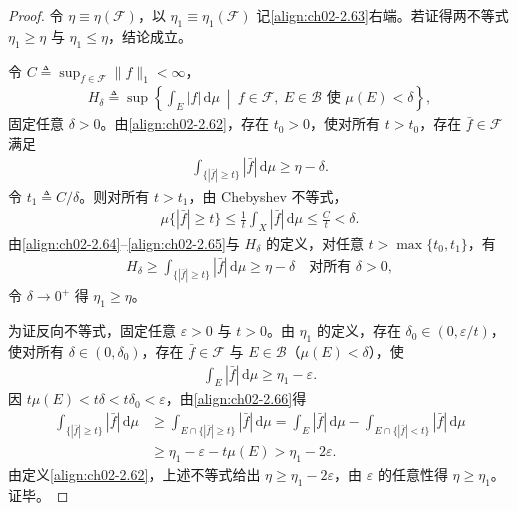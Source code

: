 \documentclass[../../main.tex]{subfiles}%
\begin{document}
\begin{proof}
令 $\eta\equiv\eta(\mathscr F)$，以 $\eta_1\equiv\eta_1(\mathscr F)$ 记\eqref{align:ch02-2.63}右端。若证得两不等式 $\eta_1\geqslant\eta$ 与 $\eta_1\leqslant\eta$，结论成立。

令 $C\triangleq \sup_{f\in\mathscr F}\|f\|_1<\infty$，
\begin{align*}
H_\delta\triangleq \sup\left\{\int_E|f|\,\mathrm{d}\mu\ \middle|\ f\in\mathscr F,\ E\in\mathscr B\text{ 使 }\mu(E)<\delta\right\},
\end{align*}
固定任意 $\delta>0$。由\eqref{align:ch02-2.62}，存在 $t_0>0$，使对所有 $t>t_0$，存在 $\bar f\in\mathscr F$ 满足
\begin{align}
\int_{\{|\bar f|\geqslant t\}}|\bar f|\,\mathrm{d}\mu\geqslant\eta-\delta. \label{align:ch02-2.64}
\end{align}
令 $t_1\triangleq C/\delta$。则对所有 $t>t_1$，由 Chebyshev 不等式，
\begin{align}
\mu\{|\bar f|\geqslant t\}\leqslant\frac1t\int_X|\bar f|\,\mathrm{d}\mu\leqslant\frac Ct<\delta. \label{align:ch02-2.65}
\end{align}
由\eqref{align:ch02-2.64}--\eqref{align:ch02-2.65}与 $H_\delta$ 的定义，对任意 $t>\max\{t_0,t_1\}$，有
\begin{align*}
H_\delta\geqslant\int_{\{|\bar f|\geqslant t\}}|\bar f|\,\mathrm{d}\mu\geqslant\eta-\delta\quad\text{对所有 }\delta>0,
\end{align*}
令 $\delta\to0^+$ 得 $\eta_1\geqslant\eta$。

为证反向不等式，固定任意 $\varepsilon>0$ 与 $t>0$。由 $\eta_1$ 的定义，存在 $\delta_0\in(0,\varepsilon/t)$，使对所有 $\delta\in(0,\delta_0)$，存在 $\bar f\in\mathscr F$ 与 $E\in\mathscr B$（$\mu(E)<\delta$），使
\begin{align}
\int_E|\bar f|\,\mathrm{d}\mu\geqslant\eta_1-\varepsilon. \label{align:ch02-2.66}
\end{align}
因 $t\mu(E)<t\delta<t\delta_0<\varepsilon$，由\eqref{align:ch02-2.66}得
\begin{align*}
\int_{\{|\bar f|\geqslant t\}}|\bar f|\,\mathrm{d}\mu
&\geqslant\int_{E\cap\{|\bar f|\geqslant t\}}|\bar f|\,\mathrm{d}\mu
=\int_E|\bar f|\,\mathrm{d}\mu-\int_{E\cap\{|\bar f|<t\}}|\bar f|\,\mathrm{d}\mu\\
&\geqslant\eta_1-\varepsilon-t\mu(E)>\eta_1-2\varepsilon.
\end{align*}
由定义\eqref{align:ch02-2.62}，上述不等式给出 $\eta\geqslant\eta_1-2\varepsilon$，由 $\varepsilon$ 的任意性得 $\eta\geqslant\eta_1$。证毕。
\end{proof}
\end{document}
